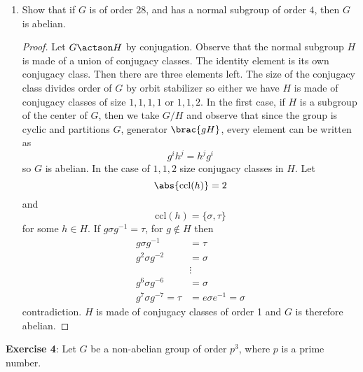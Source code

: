 \documentclass{article}
\begin{document}
\begin{enumerate}
	\item Show that if $G$ is of order $28$, and has a normal subgroup of order $4$, then $G$ is abelian.
		\begin{proof}
			Let $G \actson H$ by conjugation. Observe that the normal subgroup $H$ is made of a union of conjugacy classes. The identity element is its own conjugacy class. Then there are three elements left. The size of the conjugacy class divides order of $G$ by orbit stabilizer so either we have $H$ is made of conjugacy classes of size $1, 1, 1, 1$ or $1, 1, 2$. In the first case, if $H$ is a subgroup of the center of $G$, then we take $G/H$ and observe that since the group is cyclic and partitions $G$, generator $\brac{gH}$, every element can be written as 
			\begin{equation*}
				g^{i}h^{j} = h^{j}g^{i}
			\end{equation*}
			so $G$ is abelian. In the case of $1, 1, 2$ size conjugacy classes in $H$. Let 
			\begin{equation*}
				\abs{\text{ccl}(h)}  = 2
			\end{equation*}
			and 
			\begin{equation*}
				\text{ccl}(h) = \{\sigma, \tau\}
			\end{equation*}
			for some $h \in H$. If $g \sigma g^{-1} = \tau$, for $g \notin H$ then
			\begin{align*}
				g \sigma g^{-1} &= \tau \\
				g^{2} \sigma g^{-2} &= \sigma \\
						    &\vdots \\
				g^{6} \sigma g^{-6} &= \sigma \\
				g^{7} \sigma g^{-7} = \tau &= e \sigma e^{-1} = \sigma
			\end{align*}
			contradiction. $H$ is made of conjugacy classes of order 1 and $G$ is therefore abelian.
		\end{proof}
\end{enumerate}
\textbf{Exercise 4}: Let $G$ be a non-abelian group of order $p^{3}$, where $p$ is a prime number. 
\end{document}
